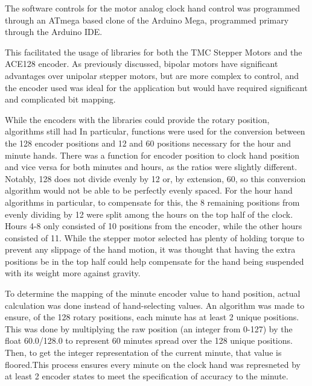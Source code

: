 \documentclass[11pt]{article}
\begin{document}
The software controls for the motor analog clock hand control was programmed  through an ATmega based clone of the Arduino Mega, programmed primary through the Arduino IDE. 

This facilitated the usage of libraries for both the TMC Stepper Motors and the ACE128 encoder. As previously discussed, bipolar motors have significant advantages over unipolar stepper motors, but are more complex to control, and the encoder used was ideal for the application but would have required significant and complicated bit mapping. 

While the encoders with the libraries could provide the rotary position, algorithms still had
In particular, functions were used for the conversion between the 128 encoder positions and 12 and 60 positions necessary for the hour and minute hands. There was a function for encoder position to clock hand position and vice versa for both minutes and hours, as the ratios were slightly different. Notably, 128 does not divide evenly by 12 or, by extension, 60, so this conversion algorithm would not be able to be perfectly evenly spaced. For the hour hand algorithms in particular, to compensate for this, the 8 remaining positions from evenly dividing by 12 were split among the hours on the top half of the clock. Hours 4-8 only consisted of 10 positions from the encoder, while the other hours consisted of 11. While the stepper motor selected has plenty of holding torque to prevent any slippage of the hand motion, it was thought that having the extra positions be in the top half could help compensate for the hand being suspended with its weight more against gravity.

To determine the mapping of the minute encoder value to hand position, actual calculation was done instead of hand-selecting values. An algorithm was made to ensure, of the 128 rotary positions, each minute has at least 2 unique positions. This was done by multiplying the raw position (an integer from 0-127) by the float 60.0/128.0 to represent 60 minutes spread over the 128 unique positions. Then, to get the integer representation of the current minute, that value is floored.This process ensures every minute on the clock hand was represneted by at least 2 encoder states to meet the specification of accuracy to the minute. 


\end{document}
